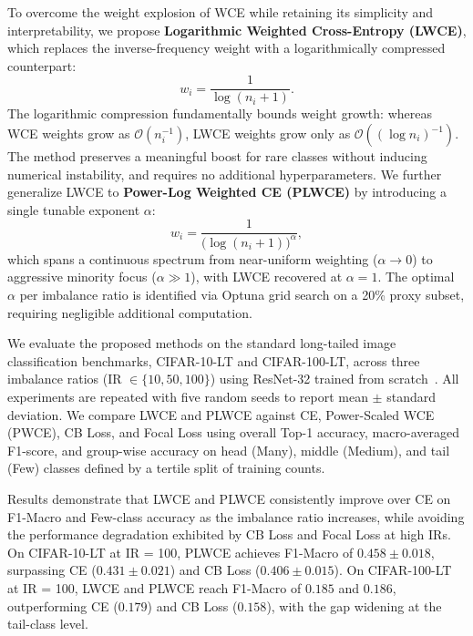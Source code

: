 \documentclass[12pt]{article}
\begin{document}
To overcome the weight explosion of WCE while retaining its simplicity and
interpretability, we propose \textbf{Logarithmic Weighted Cross-Entropy (LWCE)},
which replaces the inverse-frequency weight with a logarithmically compressed
counterpart:
\begin{equation}
  w_i = \frac{1}{\log(n_i + 1)}.
  \label{eq:lwce}
\end{equation}
The logarithmic compression fundamentally bounds weight growth:
whereas WCE weights grow as $\mathcal{O}(n_i^{-1})$, LWCE weights grow only as
$\mathcal{O}((\log n_i)^{-1})$.
The method preserves a meaningful boost for rare classes without
inducing numerical instability, and requires no additional hyperparameters.
We further generalize LWCE to \textbf{Power-Log Weighted CE (PLWCE)} by introducing
a single tunable exponent $\alpha$:
\begin{equation}
  w_i = \frac{1}{\bigl(\log(n_i + 1)\bigr)^\alpha},
  \label{eq:plwce}
\end{equation}
which spans a continuous spectrum from near-uniform weighting ($\alpha \to 0$) to
aggressive minority focus ($\alpha \gg 1$), with LWCE recovered at $\alpha = 1$.
The optimal $\alpha$ per imbalance ratio is identified via Optuna grid search on a
20\% proxy subset, requiring negligible additional computation.

We evaluate the proposed methods on the standard long-tailed image classification
benchmarks, CIFAR-10-LT and CIFAR-100-LT, across three imbalance ratios
(IR $\in \{10, 50, 100\}$) using ResNet-32 trained from scratch~\cite{he2016}.
All experiments are repeated with five random seeds to report mean $\pm$ standard
deviation.
We compare LWCE and PLWCE against CE, Power-Scaled WCE (PWCE), CB Loss, and Focal
Loss using overall Top-1 accuracy, macro-averaged F1-score, and group-wise accuracy
on head (Many), middle (Medium), and tail (Few) classes defined by a tertile split
of training counts.

Results demonstrate that LWCE and PLWCE consistently improve over CE on F1-Macro
and Few-class accuracy as the imbalance ratio increases, while avoiding the
performance degradation exhibited by CB Loss and Focal Loss at high IRs.
On CIFAR-10-LT at IR = 100, PLWCE achieves F1-Macro of $0.458 \pm 0.018$,
surpassing CE ($0.431 \pm 0.021$) and CB Loss ($0.406 \pm 0.015$).
On CIFAR-100-LT at IR = 100, LWCE and PLWCE reach F1-Macro of $0.185$ and $0.186$,
outperforming CE ($0.179$) and CB Loss ($0.158$), with the gap widening at the
tail-class level.
\end{document}
